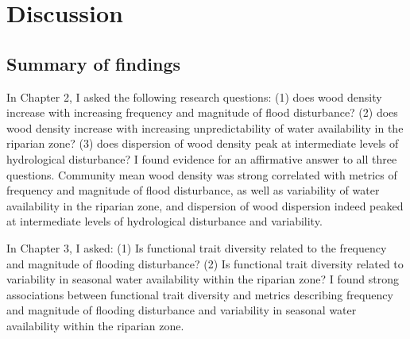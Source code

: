 \documentclass[openright,12pt,a4paper]{memoir}
\begin{document}
\doublespacing


\chapter[Discussion]{Discussion}
\newpage


\section{Summary of findings}
In Chapter 2, I asked the following research questions: (1) does wood density increase with increasing frequency and magnitude of flood disturbance? (2) does wood density increase with increasing unpredictability of water availability in the riparian zone? (3) does dispersion of wood density peak at intermediate levels of hydrological disturbance? I found evidence for an affirmative answer to all three questions. Community mean wood density was strong correlated with metrics of frequency and magnitude of flood disturbance, as well as variability of water availability in the riparian zone, and dispersion of wood dispersion indeed peaked at intermediate levels of hydrological disturbance and variability.

In Chapter 3, I asked: (1) Is functional trait diversity related to the frequency and magnitude of flooding disturbance? (2) Is functional trait diversity related to variability in seasonal water availability within the riparian zone? I found strong associations between functional trait diversity and metrics describing frequency and magnitude of flooding disturbance and variability in seasonal water availability within the riparian zone.
\end{document}
